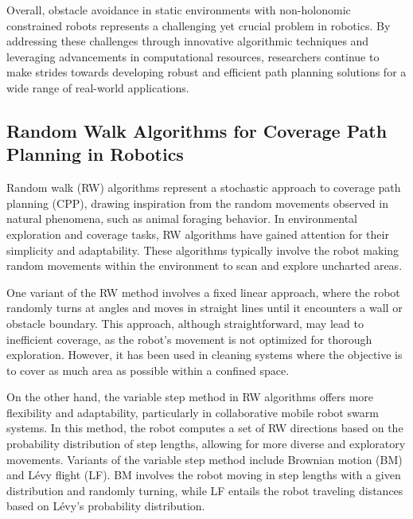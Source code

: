 Overall, obstacle avoidance in static environments with non-holonomic constrained robots represents a challenging yet crucial problem in robotics. By addressing these challenges through innovative algorithmic techniques and leveraging advancements in computational resources, researchers continue to make strides towards developing robust and efficient path planning solutions for a wide range of real-world applications.


\subsection{Random Walk Algorithms for Coverage Path Planning in Robotics}

Random walk (RW) algorithms represent a stochastic approach to coverage path planning (CPP), drawing inspiration from the random movements observed in natural phenomena, such as animal foraging behavior. In environmental exploration and coverage tasks, RW algorithms have gained attention for their simplicity and adaptability. These algorithms typically involve the robot making random movements within the environment to scan and explore uncharted areas.

\vspace*{6mm}

One variant of the RW method involves a fixed linear approach, where the robot randomly turns at angles and moves in straight lines until it encounters a wall or obstacle boundary. This approach, although straightforward, may lead to inefficient coverage, as the robot's movement is not optimized for thorough exploration. However, it has been used in cleaning systems where the objective is to cover as much area as possible within a confined space.

\vspace*{6mm}

On the other hand, the variable step method in RW algorithms offers more flexibility and adaptability, particularly in collaborative mobile robot swarm systems. In this method, the robot computes a set of RW directions based on the probability distribution of step lengths, allowing for more diverse and exploratory movements. Variants of the variable step method include Brownian motion (BM) and Lévy flight (LF). BM involves the robot moving in step lengths with a given distribution and randomly turning, while LF entails the robot traveling distances based on Lévy's probability distribution.

\vspace*{6mm}

